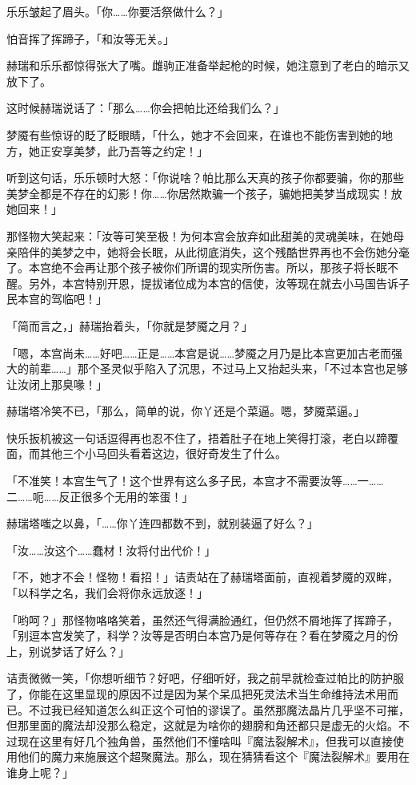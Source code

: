 乐乐皱起了眉头。「你……你要活祭做什么？」

怕音挥了挥蹄子，「和汝等无关。」

赫瑞和乐乐都惊得张大了嘴。雌驹正准备举起枪的时候，她注意到了老白的暗示又放下了。

这时候赫瑞说话了：「那么……你会把帕比还给我们么？」

梦魇有些惊讶的眨了眨眼睛，「什么，她才不会回来，在谁也不能伤害到她的地方，她正安享美梦，此乃吾等之约定！」

听到这句话，乐乐顿时大怒：「你说啥？帕比那么天真的孩子你都要骗，你的那些美梦全都是不存在的幻影！你……你居然欺骗一个孩子，骗她把美梦当成现实！放她回来！」

那怪物大笑起来：「汝等可笑至极！为何本宫会放弃如此甜美的灵魂美味，在她母亲陪伴的美梦之中，她将会长眠，从此彻底消失，这个残酷世界再也不会伤她分毫了。本宫绝不会再让那个孩子被你们所谓的现实所伤害。所以，那孩子将长眠不醒。另外，本宫特别开恩，提拔诸位成为本宫的信使，汝等现在就去小马国告诉子民本宫的驾临吧！」

「简而言之，」赫瑞抬着头，「你就是梦魇之月？」

「嗯，本宫尚未……好吧……正是……本宫是说……梦魇之月乃是比本宫更加古老而强大的前辈……」那个圣灵似乎陷入了沉思，不过马上又抬起头来，「不过本宫也足够让汝闭上那臭喙！」

赫瑞塔冷笑不已，「那么，简单的说，你丫还是个菜逼。嗯，梦魇菜逼。」

快乐扳机被这一句话逗得再也忍不住了，捂着肚子在地上笑得打滚，老白以蹄覆面，而其他三个小马回头看着这边，很好奇发生了什么。

「不准笑！本宫生气了！这个世界有这么多子民，本宫才不需要汝等……一……二……呃……反正很多个无用的笨蛋！」

赫瑞塔嗤之以鼻，「……你丫连四都数不到，就别装逼了好么？」

「汝……汝这个……蠢材！汝将付出代价！」

「不，她才不会！怪物！看招！」诘责站在了赫瑞塔面前，直视着梦魇的双眸，「以科学之名，我们会将你永远放逐！」

「哟呵？」那怪物咯咯笑着，虽然还气得满脸通红，但仍然不屑地挥了挥蹄子，「别逗本宫发笑了，科学？汝等是否明白本宫乃是何等存在？看在梦魇之月的份上，别说梦话了好么？」

诘责微微一笑，「你想听细节？好吧，仔细听好，我之前早就检查过帕比的防护服了，你能在这里显现的原因不过是因为某个呆瓜把死灵法术当生命维持法术用而已。不过我已经知道怎么纠正这个可怕的谬误了。虽然那魔法晶片几乎坚不可摧，但那里面的魔法却没那么稳定，这就是为啥你的翅膀和角还都只是虚无的火焰。不过现在这里有好几个独角兽，虽然他们不懂啥叫『魔法裂解术』，但我可以直接使用他们的魔力来施展这个超聚魔法。那么，现在猜猜看这个『魔法裂解术』要用在谁身上呢？」

